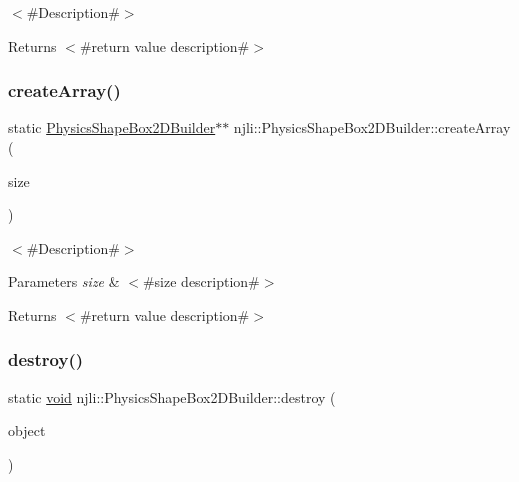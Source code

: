 $<$\#\+Description\#$>$

\begin{DoxyReturn}{Returns}
$<$\#return value description\#$>$ 
\end{DoxyReturn}
\mbox{\label{classnjli_1_1_physics_shape_box2_d_builder_ae5cacfc4548f0b36c4631ff5e37a157d}} 
\subsubsection{\texorpdfstring{create\+Array()}{createArray()}}
{\footnotesize\ttfamily static \mbox{\hyperlink{classnjli_1_1_physics_shape_box2_d_builder}{Physics\+Shape\+Box2\+D\+Builder}}$\ast$$\ast$ njli\+::\+Physics\+Shape\+Box2\+D\+Builder\+::create\+Array (\begin{DoxyParamCaption}\item[{const \mbox{\hyperlink{_util_8h_a10e94b422ef0c20dcdec20d31a1f5049}{u32}}}]{size }\end{DoxyParamCaption})\hspace{0.3cm}{\ttfamily [static]}}

$<$\#\+Description\#$>$


\begin{DoxyParams}{Parameters}
{\em size} & $<$\#size description\#$>$\\
\hline
\end{DoxyParams}
\begin{DoxyReturn}{Returns}
$<$\#return value description\#$>$ 
\end{DoxyReturn}
\mbox{\label{classnjli_1_1_physics_shape_box2_d_builder_a181009ebb721b27eade52cbb955fec43}} 
\subsubsection{\texorpdfstring{destroy()}{destroy()}}
{\footnotesize\ttfamily static \mbox{\hyperlink{_thread_8h_af1e856da2e658414cb2456cb6f7ebc66}{void}} njli\+::\+Physics\+Shape\+Box2\+D\+Builder\+::destroy (\begin{DoxyParamCaption}\item[{\mbox{\hyperlink{classnjli_1_1_physics_shape_box2_d_builder}{Physics\+Shape\+Box2\+D\+Builder}} $\ast$}]{object }\end{DoxyParamCaption})\hspace{0.3cm}{\ttfamily [static]}}

